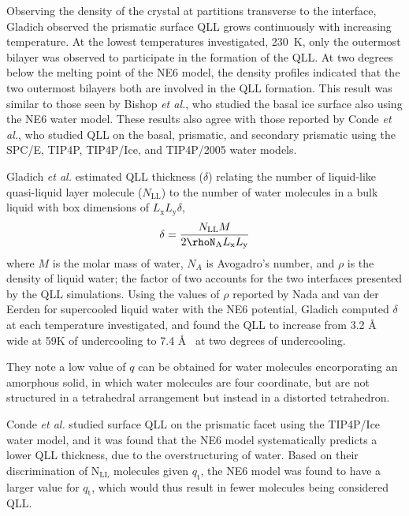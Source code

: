 Observing the density of the crystal at partitions transverse to the
interface, Gladich observed the prismatic surface QLL grows
continuously with increasing temperature. At the lowest temperatures
investigated, 230~K, only the outermost bilayer was observed to
participate in the formation of the QLL. At two degrees below the
melting point of the NE6 model, the density profiles indicated that
the two outermost bilayers both are involved in the QLL
formation. This result was similar to those seen by Bishop \textit{et
  al.}, who studied the basal ice surface also using the NE6 water
model. These results also agree with those reported by Conde
\textit{et al.}, who studied QLL on the basal, prismatic, and
secondary prismatic using the SPC/E, TIP4P, TIP4P/Ice, and TIP4P/2005
water models.\cite{Conde08} 

Gladich \textit{et al.} estimated QLL thickness ($\delta$) relating
the number of liquid-like quasi-liquid layer molecule
($N_\mathrm{LL}$) to the number of water molecules in a bulk liquid
with box dimensions of $L_\mathrm{x}L_\mathrm{y}\delta$,
\begin{equation}
\delta =
\frac{N_\mathrm{LL}M}{2\rhoN_\mathrm{A}L_\mathrm{x}L_\mathrm{y}}
\end{equation}
where $M$ is the molar mass of water, $N_{A}$ is Avogadro's number,
and $\rho$ is the density of liquid water; the factor of two accounts for
the two interfaces presented by the QLL simulations. Using the
values of $\rho$ reported by Nada and van der Eerden for supercooled
liquid water with the NE6 potential,\cite{Nada03} Gladich computed
$\delta$ at each temperature investigated, and found the QLL to
increase from 3.2 \AA~ wide at 59K of undercooling to 7.4 \AA~ at two
degrees of undercooling.  

They note a low value of $q$ can be obtained for water molecules
encorporating an amorphous solid, in which water molecules are four
coordinate, but are not structured in a tetrahedral arrangement but
instead in a distorted tetrahedron. 

Conde \textit{et al.} studied surface QLL on the prismatic facet using
the TIP4P/Ice water model,\cite{Conde08} and it was found that the NE6
model systematically predicts a lower QLL thickness, due to the
overstructuring of water. Based on their discrimination of
N$_\mathrm{LL}$ molecules given $q_\mathrm{t}$, the NE6 model was
found to have a larger value for $q_\mathrm{t}$, which would thus
result in fewer molecules being considered QLL.

